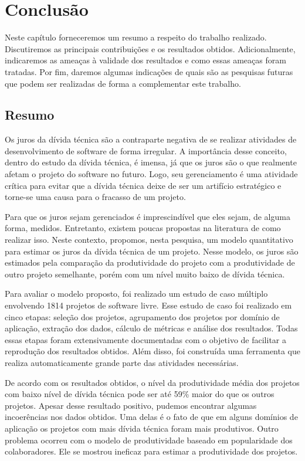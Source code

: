 \chapter{Conclusão}

Neste capítulo forneceremos um resumo a respeito do trabalho realizado. Discutiremos as principais contribuições e os resultados obtidos. Adicionalmente, indicaremos as ameaças à validade dos resultados e como essas ameaças foram tratadas. Por fim, daremos algumas indicações de quais são as pesquisas futuras que podem ser realizadas de forma a complementar este trabalho. 

\section{Resumo}

Os juros da dívida técnica são a contraparte negativa de se realizar atividades de desenvolvimento de software de forma irregular. A importância desse conceito, dentro do estudo da dívida técnica, é imensa, já que os juros são o que realmente afetam o projeto do software no futuro. Logo, seu gerenciamento é uma atividade crítica para evitar que a dívida técnica deixe de ser um artifício estratégico e torne-se uma causa para o fracasso de um projeto. 

Para que os juros sejam gerenciados é imprescindível que eles sejam, de alguma forma, medidos. Entretanto, existem poucas propostas na literatura de como realizar isso. Neste contexto, propomos, nesta pesquisa, um modelo quantitativo para estimar os juros da dívida técnica de um projeto.  Nesse modelo, os juros são estimados pela comparação da produtividade do projeto com a produtividade de outro projeto semelhante, porém com um nível muito baixo de dívida técnica. 

Para avaliar o modelo proposto, foi realizado um estudo de caso múltiplo envolvendo 1814 projetos de software livre. Esse estudo de caso foi realizado em cinco etapas: seleção dos projetos, agrupamento dos projetos por domínio de aplicação, extração dos dados, cálculo de métricas e análise dos resultados. Todas essas etapas foram extensivamente documentadas com o objetivo de facilitar a reprodução dos resultados obtidos. Além disso, foi construída uma ferramenta que realiza automaticamente grande parte das atividades necessárias.

De acordo com os resultados obtidos, o nível da produtividade média dos projetos com baixo nível de dívida técnica pode ser até 59\% maior do que os outros projetos. Apesar desse resultado positivo, pudemos encontrar algumas incoerências nos dados obtidos. Uma delas é o fato de que em alguns domínios de aplicação os projetos com mais dívida técnica foram mais produtivos. Outro problema ocorreu com o modelo de produtividade baseado em popularidade dos colaboradores. Ele se mostrou ineficaz para estimar a produtividade dos projetos.



